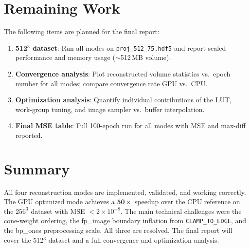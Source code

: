 \documentclass[11pt,a4paper]{article}
\begin{document}
\section{Remaining Work}

The following items are planned for the final report:

\begin{enumerate}
  \item \textbf{512$^3$ dataset}: Run all modes on \texttt{proj\_512\_75.hdf5} and
        report scaled performance and memory usage ($\sim$512\,MB volume).
  \item \textbf{Convergence analysis}: Plot reconstructed volume statistics vs.\
        epoch number for all modes; compare convergence rate GPU vs.\ CPU.
  \item \textbf{Optimization analysis}: Quantify individual contributions of the
        LUT, work-group tuning, and image sampler vs.\ buffer interpolation.
  \item \textbf{Final MSE table}: Full 100-epoch run for all modes with MSE and
        max-diff reported.
\end{enumerate}

\section{Summary}

All four reconstruction modes are implemented, validated, and working correctly.
The GPU optimized mode achieves a $\mathbf{50\times}$ speedup over the CPU reference
on the $256^3$ dataset with MSE $< 2\times10^{-8}$. The main technical challenges
were the cone-weight ordering, the fp\_image boundary inflation from
\texttt{CLAMP\_TO\_EDGE}, and the bp\_ones preprocessing scale. All three are
resolved. The final report will cover the 512$^3$ dataset and a full convergence
and optimization analysis.
\end{document}
